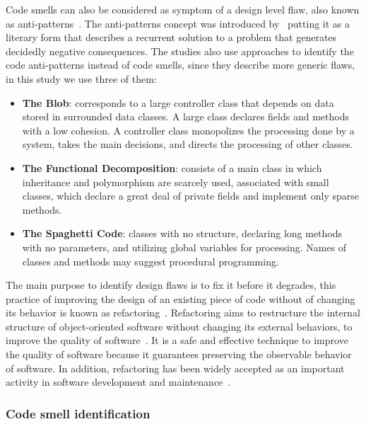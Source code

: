 Code smells can also be considered as symptom of a design level flaw, also known as anti-patterns~\citep{moha2010decor}. The anti-patterns concept was introduced by~\citet{brown1998antipatterns} putting it as a literary form that describes a recurrent solution to a problem that generates decidedly negative consequences. The studies also use approaches to identify the code anti-patterns instead of code smells, since they describe more generic flaws, in this study we use three of them:
\begin{itemize}
	\item \textbf{The Blob}: corresponds to a large controller class that depends on data stored in surrounded data classes. A large class declares fields and methods with a low cohesion. A controller class monopolizes  the processing done by a system, takes the main decisions, and directs the processing of other classes. 
    \item \textbf{The Functional Decomposition}: consists of a main class  in which inheritance and polymorphism are scarcely used, associated with small classes, which declare a great deal of private fields and implement only sparse methods.
    \item \textbf{The Spaghetti Code}: classes with no structure, declaring long methods with no parameters, and utilizing global variables for processing. Names of classes and methods may suggest procedural programming.
\end{itemize}

The main purpose to identify design flaws is to fix it before it degrades, this practice of improving the design of an existing piece of code without of changing its behavior is known as refactoring~\citep{granhem2014model}. Refactoring aims to restructure the internal structure of object-oriented software without changing its external behaviors, to improve the quality of software~\citep{fowler1999refactoring}. It is a safe and effective technique to improve the quality of software because it guarantees preserving the observable behavior of software. In addition, refactoring has been widely accepted as an important activity in software development and maintenance~\citep{lee2011automated}. 

\subsubsection{Code smell identification}


